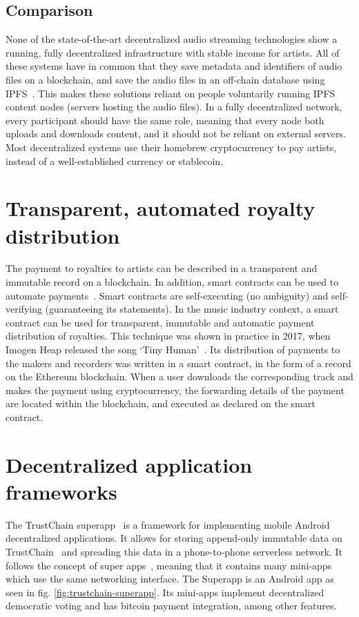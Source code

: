\subsection{Comparison}
None of the state-of-the-art decentralized audio streaming technologies show a running, fully decentralized infrastructure with stable income for artists. All of these systems have in common that they save metadata and identifiers of audio files on a blockchain, and save the audio files in an off-chain database using IPFS~\citep{benet2014ipfs}. This makes these solutions reliant on people voluntarily running IPFS content nodes (servers hosting the audio files). In a fully decentralized network, every participant should have the same role, meaning that every node both uploads and downloads content, and it should not be reliant on external servers. Most decentralized systems use their homebrew cryptocurrency to pay artists, instead of a well-established currency or stablecoin. 

\section{Transparent, automated royalty distribution}
\label{sec:smart-contracts}
The payment to royalties to artists can be described in a transparent and immutable record on a blockchain. In addition, smart contracts can be used to automate payments~\citep{buterin2014next}. Smart contracts are self-executing (no ambiguity) and self-verifying (guaranteeing its statements). In the music industry context, a smart contract can be used for transparent, immutable and automatic payment distribution of royalties. This technique was shown in practice in 2017, when Imogen Heap released the song `Tiny Human'~\citep{heap2017blockchain}. Its distribution of payments to the makers and recorders was written in a smart contract, in the form of a record on the Ethereum blockchain. When a user downloads the corresponding track and makes the payment using cryptocurrency, the forwarding details of the payment are located within the blockchain, and executed as declared on the smart contract.

\section{Decentralized application frameworks}
\label{sec:sote-trustchain}
The TrustChain superapp~\citep{mattskala2020} is a framework for implementing mobile Android decentralized applications. It allows for storing append-only immutable data on TrustChain~\citep{otte2017trustchain} and spreading this data in a phone-to-phone serverless network. It follows the concept of super apps~\citep{kpmg2019superapps}, meaning that it contains many mini-apps which use the same networking interface. The Superapp is an Android app as seen in fig. \ref{fig:trustchain-superapp}. Its mini-apps implement decentralized democratic voting and has bitcoin payment integration, among other features.

